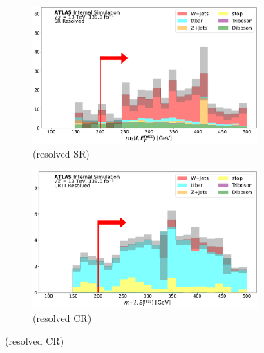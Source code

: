   \begin{figure}[htbp]
  \centering

     \begin{subfigure}{0.45\textwidth}
     \includegraphics[width = 0.95\textwidth]{Figures/App_SR_CR_distributions/SR1L_Resolved/mT_lep_met_N_1.pdf}
    \caption{\mtlepmet (resolved SR)}
     \end{subfigure}
    \begin{subfigure}{0.45\textwidth}
     \includegraphics[width = 0.95\textwidth]{Figures/App_SR_CR_distributions/CRTT_Resolved/mT_lep_met_N_1.pdf}
     \caption{\mtlepmet (resolved \ttbar CR)}
     \end{subfigure}


\end{figure}

